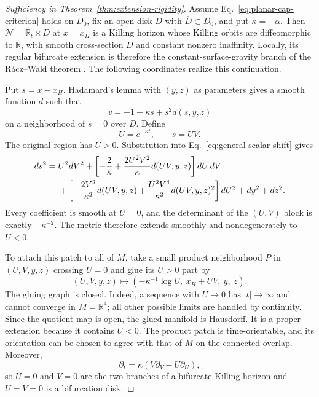 \documentclass[10pt]{article}
\begin{document}
\begin{proof}[Sufficiency in Theorem~\ref{thm:extension-rigidity}]
Assume Eq.~\eqref{eq:planar-cap-criterion} holds on \(D_0\), fix an open disk
\(D\) with \(\overline D\subset D_0\), and put \(\kappa=-\alpha\).  Then
\(\mathcal N=\mathbb R_t\times D\) at \(x=x_H\) is a Killing horizon whose
Killing orbits are diffeomorphic to \(\mathbb R\), with smooth cross-section
\(D\) and constant nonzero inaffinity.  Locally, its regular bifurcate extension
is therefore the constant-surface-gravity branch of the R\'acz--Wald theorem
\cite{RaczWald1992}.  The following coordinates realize this continuation.

Put \(s=x-x_H\).  Hadamard's lemma with \((y,z)\) as parameters gives a
smooth function \(d\) such that
\begin{equation}
  v=-1-\kappa s+s^2d(s,y,z)
  \label{eq:cap-hadamard-form}
\end{equation}
on a neighborhood of \(s=0\) over \(D\).  Define
\begin{equation}
  U=e^{-\kappa t},\qquad s=UV.
  \label{eq:cap-kruskal-coordinates}
\end{equation}
The original region has \(U>0\).  Substitution into
Eq.~\eqref{eq:general-scalar-shift} gives
\begin{align}
 ds^2={}&U^2dV^2
 +\left[-\frac{2}{\kappa}
 +\frac{2U^2V^2}{\kappa}d(UV,y,z)\right]dU\,dV \notag\\
 &+\left[-\frac{2V^2}{\kappa^2}d(UV,y,z)
 +\frac{U^2V^4}{\kappa^2}d(UV,y,z)^2\right]dU^2
 +dy^2+dz^2 .
 \label{eq:cap-extended-metric}
\end{align}
Every coefficient is smooth at \(U=0\), and the determinant of the
\((U,V)\) block is exactly \(-\kappa^{-2}\).  The metric therefore extends
smoothly and nondegenerately to \(U<0\).

To attach this patch to all of \(M\), take a small product neighborhood
\(P\) in \((U,V,y,z)\) crossing \(U=0\) and glue its \(U>0\) part by
\begin{equation}
  (U,V,y,z)\longmapsto
  \left(-\kappa^{-1}\log U,\ x_H+UV,\ y,\ z\right).
  \label{eq:cap-gluing-map}
\end{equation}
The gluing graph is closed.  Indeed, a sequence with \(U\to0\) has
\(|t|\to\infty\) and cannot converge in \(M=\mathbb R^4\); all other possible
limits are handled by continuity.  Since the quotient map is open, the glued
manifold is Hausdorff.  It is a proper extension because it contains \(U<0\).
The product patch is time-orientable, and its orientation can be chosen to
agree with that of \(M\) on the connected overlap.
Moreover,
\begin{equation}
  \partial_t=\kappa(V\partial_V-U\partial_U),
\end{equation}
so \(U=0\) and \(V=0\) are the two branches of a bifurcate Killing horizon
and \(U=V=0\) is a bifurcation disk.
\end{proof}
\end{document}
